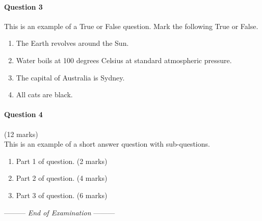 \documentclass[a4paper,12pt,fleqn]{article}
\newcommand{\lastwords}{End of Examination}
\begin{document}
\newpage
\paragraph{\textbf{Question 3}}
This is an example of a True or False question. Mark the following True or False.
\begin{enumerate}
    \item \underline{\hspace{0.5cm}} The Earth revolves around the Sun.
    \item \underline{\hspace{0.5cm}} Water boils at 100 degrees Celsius at standard atmospheric pressure.
    \item \underline{\hspace{0.5cm}} The capital of Australia is Sydney.
    \item \underline{\hspace{0.5cm}} All cats are black.
\end{enumerate}

\newpage
\paragraph{\textbf{Question 4}}\hfill (12 marks)\\
This is an example of a short answer question with sub-questions.
\begin{enumerate}
    \item Part 1 of question. \hfill (2 marks)
    \item Part 2 of question. \hfill (4 marks)
    \item Part 3 of question. \hfill (6 marks)
\end{enumerate}



\begin{center}
\vspace{3cm}
--------- \textit{\lastwords} ---------
\end{center}


\label{finalpage}
\end{document}
